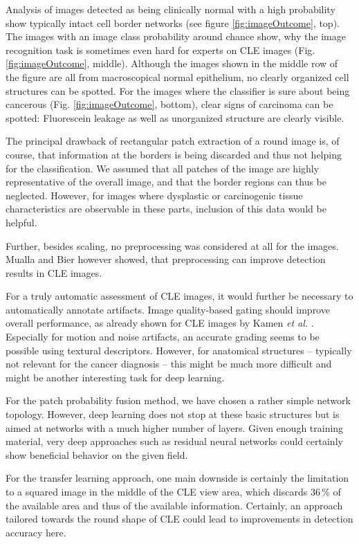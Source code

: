 \documentclass[fleqn,10pt]{wlscirep}
\begin{document}
Analysis of images detected as being clinically normal with a high probability show typically intact cell border networks (see figure \ref{fig:imageOutcome}, top). The images with an image class probability around chance show, why the image recognition task is sometimes even hard for experts on CLE images (Fig. \ref{fig:imageOutcome}, middle). Although the images shown in the middle row of the figure are all from macroscopical normal epithelium, no clearly organized cell structures can be spotted. For the images where the classifier is sure about being cancerous (Fig. \ref{fig:imageOutcome}, bottom), clear signs of carcinoma can be spotted: Fluorescein leakage as well as unorganized structure are clearly visible.



The principal drawback of rectangular patch extraction of a round
image is, of course, that information at the borders is being
discarded and thus not helping for the classification. We assumed
that all patches of the image are highly representative of the overall
image, and that the border regions can thus be neglected. However, for
images where dysplastic or carcinogenic tissue characteristics are
observable in these parts, inclusion of this data would be helpful.

Further, besides scaling, no preprocessing was considered at all for the images. Mualla\cite{Mualla:2014ko} and Bier\cite{Bier:2015ju} however showed, that preprocessing can improve detection results in CLE images.

For a truly automatic assessment of CLE images, it would further be necessary to automatically annotate artifacts. Image quality-based gating should improve overall performance, as already shown for CLE images by Kamen \textit{et al.} \cite{Kamen:2016jw}. Especially for motion and noise artifacts, an accurate grading seems to be possible using textural descriptors. However, for anatomical structures -- typically not relevant for the cancer diagnosis -- this might be much more difficult and might be another interesting task for deep learning.


For the patch probability fusion method, we have chosen a rather simple network topology. However, deep learning does not stop at these basic structures but is aimed at networks with a much higher number of layers. Given enough training material, very deep approaches such as residual neural networks \cite{He:2016ib} could certainly show beneficial behavior on the given field.

For the transfer learning approach, one main downside is certainly the limitation to a squared image in the middle of the CLE view area, which discards 36\,\% of the available area and thus of the available information. Certainly, an approach tailored towards the round shape of CLE could lead to improvements in detection accuracy here.
\end{document}
